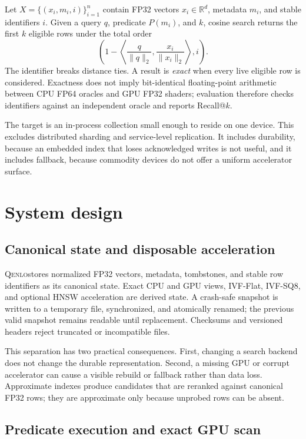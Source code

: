 \documentclass{article}
\newcommand{\qenlo}{\textsc{Qenlo}}
\begin{document}
Let $X=\{(x_i,m_i,i)\}_{i=1}^{n}$ contain FP32 vectors $x_i\in\mathbb{R}^{d}$,
metadata $m_i$, and stable identifiers $i$. Given a query $q$, predicate $P(m_i)$, and
$k$, cosine search returns the first $k$ eligible rows under the total order
\begin{equation}
  \left(1-\left\langle \frac{q}{\lVert q\rVert_2},
  \frac{x_i}{\lVert x_i\rVert_2}\right\rangle, i\right).
\end{equation}
The identifier breaks distance ties. A result is \emph{exact} when every live eligible row is
considered. Exactness does not imply bit-identical floating-point arithmetic between CPU FP64
oracles and GPU FP32 shaders; evaluation therefore checks identifiers against an independent
oracle and reports Recall@$k$.

The target is an in-process collection small enough to reside on one device. This excludes
distributed sharding and service-level replication. It includes durability, because an embedded
index that loses acknowledged writes is not useful, and it includes fallback, because commodity
devices do not offer a uniform accelerator surface.

\section{System design}

\subsection{Canonical state and disposable acceleration}

\qenlo stores normalized FP32 vectors, metadata, tombstones, and stable row identifiers as its
canonical state. Exact CPU and GPU views, IVF-Flat, IVF-SQ8, and optional HNSW acceleration are
derived state. A crash-safe snapshot is written to a temporary file, synchronized, and atomically
renamed; the previous valid snapshot remains readable until replacement. Checksums and versioned
headers reject truncated or incompatible files.

This separation has two practical consequences. First, changing a search backend does not change
the durable representation. Second, a missing GPU or corrupt accelerator can cause a visible
rebuild or fallback rather than data loss. Approximate indexes produce candidates that are reranked
against canonical FP32 rows; they are approximate only because unprobed rows can be absent.

\subsection{Predicate execution and exact GPU scan}
\end{document}
